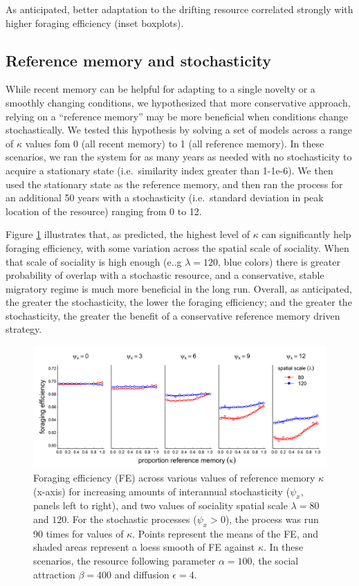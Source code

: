 \documentclass[12pt]{article}
\begin{document}
As anticipated, better adaptation to the drifting resource correlated strongly with higher foraging efficiency (inset boxplots).

\subsection{Reference memory and stochasticity}

While recent memory can be helpful for adapting to a single novelty or a smoothly changing conditions, we hypothesized that more conservative approach, relying on a ``reference memory'' may be more beneficial when conditions change stochastically. We tested this hypothesis by solving a set of models across a range of $\kappa$ values fom 0 (all recent memory) to 1 (all reference memory). In these scenarios, we ran the system for as many years as needed with no stochasticity to acquire a stationary state (i.e.~similarity index greater than 1-1e-6). We then used the stationary state as the reference memory, and then ran the process for an additional 50 years with a stochasticity (i.e.~standard deviation in peak location of the resource) ranging from 0 to 12.

Figure \ref{fig_stochasticity} illustrates that, as predicted, the highest level of $\kappa$ can significantly help foraging efficiency, with some variation across the spatial scale of sociality. When that scale of sociality is high enough (e..g $\lambda = 120$, blue colors) there is greater probability of overlap with a stochastic resource, and a conservative, stable migratory regime is much more beneficial in the long run. Overall, as anticipated, the greater the stochasticity, the lower the foraging efficiency; and the greater the stochasticity, the greater the benefit of a conservative reference memory driven strategy.

\begin{figure}
\includegraphics[width=\textwidth]{figures/stochasticity.png}

\caption{\label{fig_stochasticity} Foraging efficiency (FE) across various values of reference memory $\kappa$ (x-axis) for increasing amounts of interannual stochasticity ($\psi_x$, panels left to right), and two values of sociality spatial scale $\lambda = 80$ and $120$. For the stochastic processes ($\psi_x > 0$), the process was run 90 times for values of $\kappa$. Points represent the means of the FE, and shaded areas represent a loess smooth of FE against $\kappa$. In these scenarios, the resource following parameter $\alpha = 100$, the social attraction $\beta = 400$ and diffusion $\epsilon = 4$.} 

\end{figure}
\end{document}
